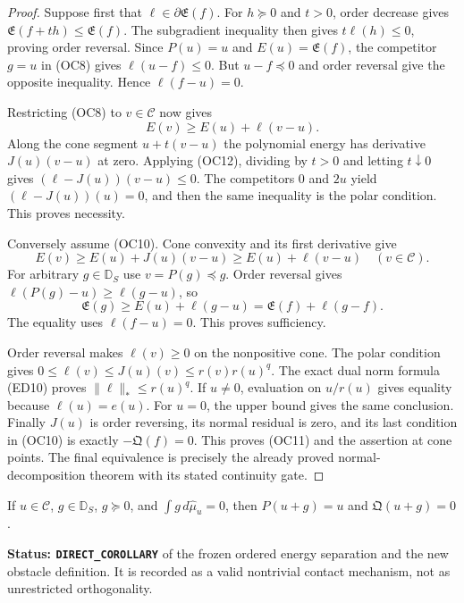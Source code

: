 \begin{proof}
Suppose first that $\ell\in\partial\mathfrak E(f)$.
For $h\succeq0$ and $t>0$, order decrease gives
$\mathfrak E(f+th)\le\mathfrak E(f)$.  The subgradient
inequality then gives $t\ell(h)\le0$, proving order reversal.
Since $P(u)=u$ and $E(u)=\mathfrak E(f)$, the competitor
$g=u$ in \textup{(OC8)} gives $\ell(u-f)\le0$.
But $u-f\preceq0$ and order reversal give the opposite
inequality.  Hence $\ell(f-u)=0$.

Restricting \textup{(OC8)} to $v\in\mathscr C$ now gives
\[
                        E(v)\ge E(u)+\ell(v-u).
 \tag{OC12}
\]
Along the cone segment $u+t(v-u)$ the polynomial energy
has derivative $J(u)(v-u)$ at zero.  Applying
\textup{(OC12)}, dividing by $t>0$ and letting $t\downarrow0$
gives $(\ell-J(u))(v-u)\le0$.  The competitors $0$ and
$2u$ yield $(\ell-J(u))(u)=0$, and then the same inequality
is the polar condition.  This proves necessity.

Conversely assume \textup{(OC10)}.  Cone convexity and its
first derivative give
\[
 E(v)\ge E(u)+J(u)(v-u)\ge E(u)+\ell(v-u)
                                     \quad(v\in\mathscr C).
\]
For arbitrary $g\in\mathbb D_S$ use $v=P(g)\preceq g$.
Order reversal gives $\ell(P(g)-u)\ge\ell(g-u)$, so
\[
 \mathfrak E(g)\ge E(u)+\ell(g-u)
                 =\mathfrak E(f)+\ell(g-f).
\]
The equality uses $\ell(f-u)=0$.  This proves sufficiency.

Order reversal makes $\ell(v)\ge0$ on the nonpositive cone.
The polar condition gives
$0\le\ell(v)\le J(u)(v)\le r(v)r(u)^q$.
The exact dual norm formula \textup{(ED10)} proves
$\|\ell\|_*\le r(u)^q$.  If $u\ne0$, evaluation on
$u/r(u)$ gives equality because $\ell(u)=e(u)$.
For $u=0$, the upper bound gives the same conclusion.
Finally $J(u)$ is order reversing, its normal residual is
zero, and its last condition in \textup{(OC10)} is exactly
$-\mathfrak Q(f)=0$.  This proves \textup{(OC11)} and
the assertion at cone points.  The final equivalence is
precisely the already proved normal-decomposition theorem
with its stated continuity gate.
\end{proof}

\begin{corollary}
\label{cor:r12-zero-mass-obstacle-slack}
If $u\in\mathscr C$, $g\in\mathbb D_S$, $g\succeq0$, and
$\int g\,d\widehat\mu_u=0$, then
$P(u+g)=u$ and $\mathfrak Q(u+g)=0$.
\end{corollary}

\noindent\textbf{Status: \texttt{DIRECT\_COROLLARY}} of
the frozen ordered energy separation and the new obstacle definition.
It is recorded as a valid nontrivial contact mechanism, not as
unrestricted orthogonality.


